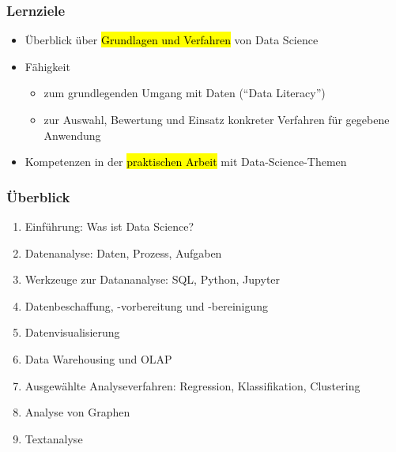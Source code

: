   
  \begin{frame}
  
    \frametitle{Lernziele}
  
  \begin{itemize}
  \item Überblick über \hl{Grundlagen und Verfahren} von Data Science
  \item Fähigkeit 
  \begin{itemize}
  \item zum grundlegenden Umgang mit Daten ("`Data Literacy"')
  \item zur Auswahl, Bewertung und Einsatz konkreter Verfahren für
    gegebene Anwendung 
  \end{itemize}
  \item Kompetenzen in der \hl{praktischen Arbeit} mit Data-Science-Themen 
\end{itemize}
  
  \end{frame}

  
  \begin{frame}
    \frametitle{Überblick}
  
    \begin{enumerate}
    \item<1-> Einführung: Was ist Data Science?
    \item<2-> Datenanalyse: Daten, Prozess, Aufgaben
    \item<3-> Werkzeuge zur Datananalyse: SQL, Python, Jupyter
    \item<4-> Datenbeschaffung, -vorbereitung und -bereinigung
    \item<5-> Datenvisualisierung
    \item<6-> Data Warehousing und OLAP
    \item<7-> Ausgewählte Analyseverfahren: Regression, Klassifikation, Clustering
    \item<8-> Analyse von Graphen
    \item<9-> Textanalyse
   \end{enumerate}
  
  \end{frame}
  
  
